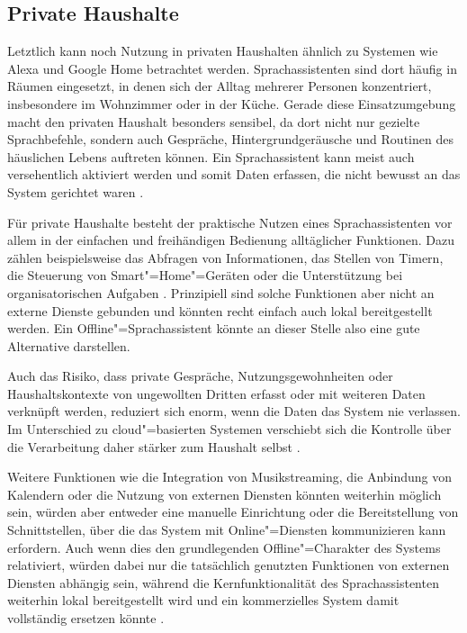 \subsection{Private Haushalte}
\label{subsec:Private_Haushalte}
Letztlich kann noch Nutzung in privaten Haushalten ähnlich zu Systemen wie Alexa und Google Home betrachtet werden. Sprachassistenten sind dort häufig in Räumen eingesetzt, in denen sich der Alltag mehrerer Personen konzentriert, insbesondere im Wohnzimmer oder in der Küche. Gerade diese Einsatzumgebung macht den privaten Haushalt besonders sensibel, da dort nicht nur gezielte Sprachbefehle, sondern auch Gespräche, Hintergrundgeräusche und Routinen des häuslichen Lebens auftreten können. Ein Sprachassistent kann meist auch versehentlich aktiviert werden und somit Daten erfassen, die nicht bewusst an das System gerichtet waren \autocite{imWohnzimmerKriegtDieSchonAllesMit}.

Für private Haushalte besteht der praktische Nutzen eines Sprachassistenten vor allem in der einfachen und freihändigen Bedienung alltäglicher Funktionen. Dazu zählen beispielsweise das Abfragen von Informationen, das Stellen von Timern, die Steuerung von Smart"=Home"=Geräten oder die Unterstützung bei organisatorischen Aufgaben \autocite{alexaKannIchDirVertrauen}. Prinzipiell sind solche Funktionen aber nicht an externe Dienste gebunden und könnten recht einfach auch lokal bereitgestellt werden. Ein Offline"=Sprachassistent könnte an dieser Stelle also eine gute Alternative darstellen.

Auch das Risiko, dass private Gespräche, Nutzungsgewohnheiten oder Haushaltskontexte von ungewollten Dritten erfasst oder mit weiteren Daten verknüpft werden, reduziert sich enorm, wenn die Daten das System nie verlassen. Im Unterschied zu cloud"=basierten Systemen verschiebt sich die Kontrolle über die Verarbeitung daher stärker zum Haushalt selbst \autocite{alexaKannIchDirVertrauen}.

Weitere Funktionen wie die Integration von Musikstreaming, die Anbindung von Kalendern oder die Nutzung von externen Diensten könnten weiterhin möglich sein, würden aber entweder eine manuelle Einrichtung oder die Bereitstellung von Schnittstellen, über die das System mit Online"=Diensten kommunizieren kann erfordern. Auch wenn dies den grundlegenden Offline"=Charakter des Systems relativiert, würden dabei nur die tatsächlich genutzten Funktionen von externen Diensten abhängig sein, während die Kernfunktionalität des Sprachassistenten weiterhin lokal bereitgestellt wird und ein kommerzielles System damit vollständig ersetzen könnte \autocite{alexaKannIchDirVertrauen}.

